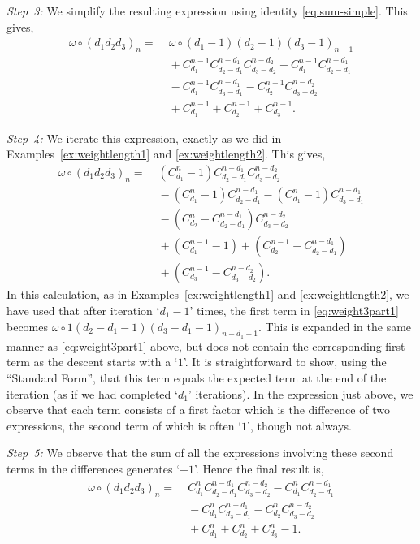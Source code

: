 \documentclass[5p,twocolumn]{elsarticle}
\begin{document}
\begin{example}
  \emph{Step~3:} We simplify the resulting expression using identity \eqref{eq:sum-simple}. This gives,
  \begin{align}
     \omega\circ(d_1d_2d_3)_n=&\;\omega\circ(d_1-1)(d_2-1)(d_3-1)_{n-1}\nonumber\\
                       &\;+C_{d_1}^{n-1}C^{n-d_1}_{d_2-d_1}C^{n-d_2}_{d_3-d_2}-C_{d_1}^{n-1}C_{d_2-d_1}^{n-d_1}\nonumber\\
                       &\;-C_{d_1}^{n-1}C_{d_3-d_1}^{n-d_1}-C_{d_2}^{n-1}C_{d_3-d_2}^{n-d_2}\nonumber\\
                       &\;+C_{d_1}^{n-1}+C_{d_2}^{n-1}+C_{d_3}^{n-1}.\label{eq:weight3part2}
  \end{align}

  \emph{Step~4:} We iterate this expression, exactly as we did in Examples~\ref{ex:weightlength1} and \ref{ex:weightlength2}. This gives,
  \begin{align*}
    \omega\circ(d_1d_2d_3)_n=&\;(C_{d_1}^{n}-1)C^{n-d_1}_{d_2-d_1}C^{n-d_2}_{d_3-d_2}\\
                             &\;-(C_{d_1}^{n}-1)C_{d_2-d_1}^{n-d_1}-(C_{d_1}^{n}-1)C_{d_3-d_1}^{n-d_1}\\
                             &\;-(C_{d_2}^{n}-C_{d_2-d_1}^{n-d_1})C_{d_3-d_2}^{n-d_2}\\
                             &\;+(C_{d_1}^{n-1}-1)+(C_{d_2}^{n-1}-C_{d_2-d_1}^{n-d_1})\\
                             &\;+(C_{d_3}^{n-1}-C_{d_3-d_2}^{n-d_2}).
  \end{align*}
  In this calculation, as in Examples~\ref{ex:weightlength1} and \ref{ex:weightlength2}, we have used that after iteration `$d_1-1$' times,
  the first term in \eqref{eq:weight3part1} becomes $\omega\circ1(d_2-d_1-1)(d_3-d_1-1)_{n-d_1-1}$.
  This is expanded in the same manner as \eqref{eq:weight3part1} above, but does not contain the corresponding first term as the descent starts with a `$1$'.
  It is straightforward to show, using the ``Standard Form'', that this term equals the expected term at the end of the iteration (as if we had completed `$d_1$' iterations).    
  In the expression just above, we observe that each term consists of a first factor which is the difference of two expressions, the second term of which is often `$1$', though not always.
  
  \emph{Step~5:} We observe that the sum of all the expressions involving these second terms in the differences generates `$-1$'. Hence the final result is,
  \begin{align}
    \omega\circ(d_1d_2d_3)_n=&\;C_{d_1}^{n}C^{n-d_1}_{d_2-d_1}C^{n-d_2}_{d_3-d_2}-C_{d_1}^{n}C^{n-d_1}_{d_2-d_1}\nonumber\\
                            &\;-C_{d_1}^{n}C^{n-d_1}_{d_3-d_1}-C_{d_2}^{n}C^{n-d_2}_{d_3-d_2}\nonumber\\
                            &\;+C^n_{d_1}+C^n_{d_2}+C^n_{d_3}-1.\label{eq:weight3}
  \end{align}
\end{example}
\end{document}
